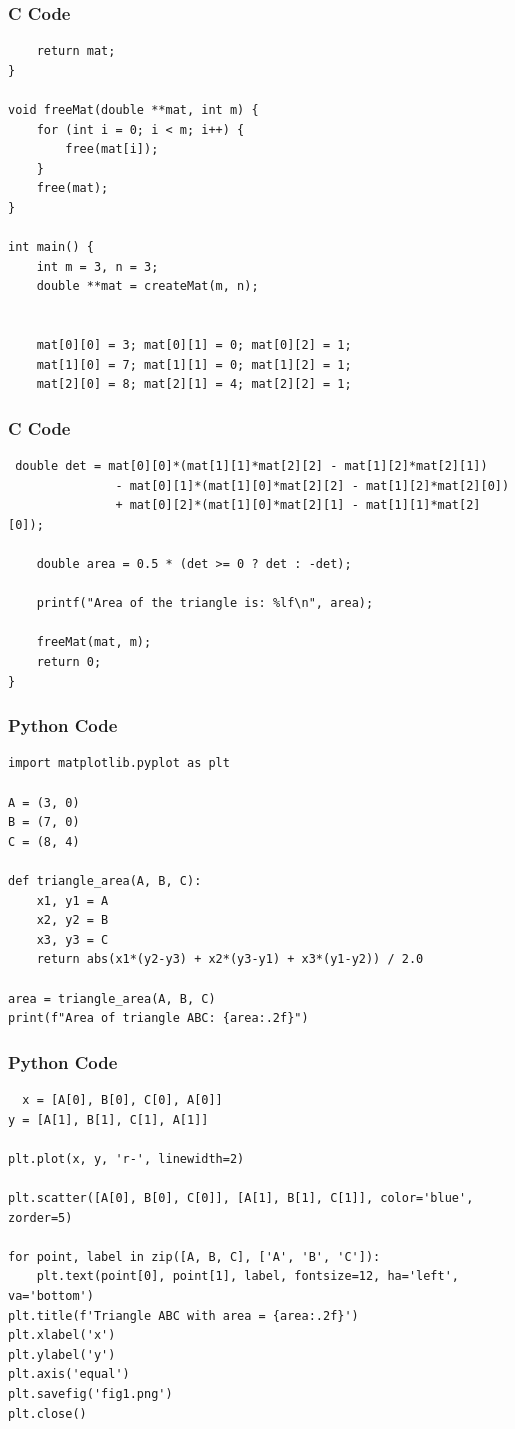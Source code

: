 \documentclass{beamer}
\begin{document}
\begin{frame}[fragile]
    \frametitle{C Code}
    \begin{lstlisting}
    return mat;
}

void freeMat(double **mat, int m) {
    for (int i = 0; i < m; i++) {
        free(mat[i]);
    }
    free(mat);
}

int main() {
    int m = 3, n = 3;
    double **mat = createMat(m, n);


    mat[0][0] = 3; mat[0][1] = 0; mat[0][2] = 1;
    mat[1][0] = 7; mat[1][1] = 0; mat[1][2] = 1;
    mat[2][0] = 8; mat[2][1] = 4; mat[2][2] = 1;

    \end{lstlisting}
\end{frame}


\begin{frame}[fragile]
    \frametitle{C Code}
    \begin{lstlisting}
 double det = mat[0][0]*(mat[1][1]*mat[2][2] - mat[1][2]*mat[2][1])
               - mat[0][1]*(mat[1][0]*mat[2][2] - mat[1][2]*mat[2][0])
               + mat[0][2]*(mat[1][0]*mat[2][1] - mat[1][1]*mat[2][0]);

    double area = 0.5 * (det >= 0 ? det : -det);

    printf("Area of the triangle is: %lf\n", area);

    freeMat(mat, m);
    return 0;
}
    \end{lstlisting}
\end{frame}



\begin{frame}[fragile]
    \frametitle{Python Code}
    \begin{lstlisting}
import matplotlib.pyplot as plt

A = (3, 0)
B = (7, 0)
C = (8, 4)

def triangle_area(A, B, C):
    x1, y1 = A
    x2, y2 = B
    x3, y3 = C
    return abs(x1*(y2-y3) + x2*(y3-y1) + x3*(y1-y2)) / 2.0

area = triangle_area(A, B, C)
print(f"Area of triangle ABC: {area:.2f}")

\end{lstlisting}
\end{frame}

\begin{frame}[fragile]
    \frametitle{Python Code}
    \begin{lstlisting}
  x = [A[0], B[0], C[0], A[0]]
y = [A[1], B[1], C[1], A[1]]

plt.plot(x, y, 'r-', linewidth=2)

plt.scatter([A[0], B[0], C[0]], [A[1], B[1], C[1]], color='blue', zorder=5)

for point, label in zip([A, B, C], ['A', 'B', 'C']):
    plt.text(point[0], point[1], label, fontsize=12, ha='left', va='bottom')
plt.title(f'Triangle ABC with area = {area:.2f}')
plt.xlabel('x')
plt.ylabel('y')
plt.axis('equal')
plt.savefig('fig1.png')
plt.close()
    \end{lstlisting}
\end{frame}
\end{document}
